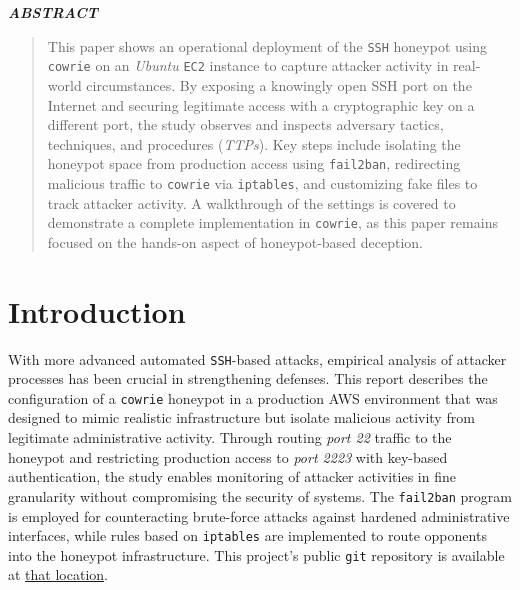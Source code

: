 \documentclass{cls/ULBreport}
\renewenvironment{abstract}{%
  \clearpage
  \thispagestyle{plain}
  \begin{center}
    \bfseries\itshape ABSTRACT
  \end{center}
  \vspace{0.5cm}
  \begin{quote}
    \itshape
    \justifying
}{%
  \end{quote}
  \clearpage
}
\begin{document}
    
    \renewcommand{\rmdefault}{cmr} %
    \renewcommand{\sfdefault}{cmss} %
    \renewcommand{\ttdefault}{cmtt} %
    
    \makeatletter
    \renewcommand{\reset@font}{\normalfont\@setfontsize\f@size{12}{14.4}}
    \makeatother
    \normalfont


    \begin{abstract}        
    This paper shows an operational deployment of the \texttt{SSH} honeypot using \texttt{cowrie} on an \textit{Ubuntu} \texttt{EC2} instance to capture attacker activity in real-world circumstances. By exposing a knowingly open SSH port on the Internet and securing legitimate access with a cryptographic key on a different port, the study observes and inspects adversary tactics, techniques, and procedures (\textit{TTPs}). Key steps include isolating the honeypot space from production access using \texttt{fail2ban}, redirecting malicious traffic to \texttt{cowrie} via \texttt{iptables}, and customizing fake files to track attacker activity. A walkthrough of the settings is covered to demonstrate a complete implementation in \texttt{cowrie}, as this paper remains focused on the hands-on aspect of honeypot-based deception. 
    \end{abstract}
    \newpage


    \section{Introduction}
    With more advanced automated \texttt{SSH}-based attacks, empirical analysis of attacker processes has been crucial in strengthening defenses. This report describes the configuration of a \texttt{cowrie} honeypot in a production AWS environment that was designed to mimic realistic infrastructure but isolate malicious activity from legitimate administrative activity. Through routing \textit{port 22} traffic to the honeypot and restricting production access to \textit{port 2223} with key-based authentication, the study enables monitoring of attacker activities in fine granularity without compromising the security of systems. The \texttt{fail2ban} program is employed for counteracting brute-force attacks against hardened administrative interfaces, while rules based on \texttt{iptables} are implemented to route opponents into the honeypot infrastructure. This project's public \texttt{git} repository is available at \href{https://github.com/nottoBD/netsec-cowrie-honey}{that location}.
\end{document}
